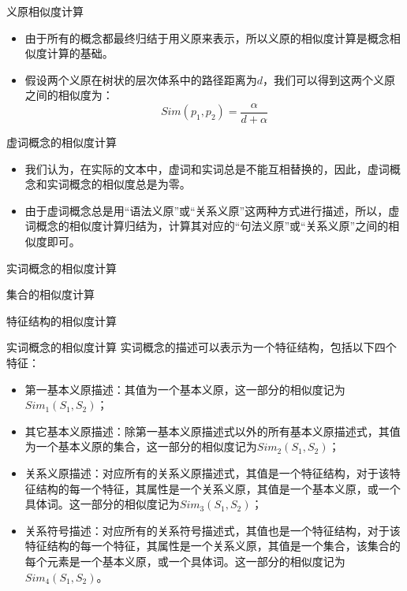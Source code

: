 \documentclass{beamer}
\begin{document}
    \begin{frame}{义原相似度计算}
      \begin{itemize}
        \item 由于所有的概念都最终归结于用义原来表示，所以义原的相似度计算是概念相似度计算的基础。
        \item 假设两个义原在树状的层次体系中的路径距离为$d$，我们可以得到这两个义原之间的相似度为：
        \begin{equation}
          Sim(p_1, p_2) = \frac{\alpha}{d + \alpha}
        \end{equation}
      \end{itemize}
    \end{frame}

    \begin{frame}{虚词概念的相似度计算}
      \begin{itemize}
        \item 我们认为，在实际的文本中，虚词和实词总是不能互相替换的，因此，虚词概念和实词概念的相似度总是为零。
        \item 由于虚词概念总是用“语法义原”或“关系义原”这两种方式进行描述，所以，虚词概念的相似度计算归结为，计算其对应的“句法义原”或“关系义原”之间的相似度即可。
      \end{itemize}
    \end{frame}

    \begin{frame}{实词概念的相似度计算}
      
    \end{frame}

    \begin{frame}{集合的相似度计算}
      
    \end{frame}

    \begin{frame}{特征结构的相似度计算}
      
    \end{frame}

    \begin{frame}{实词概念的相似度计算}
      实词概念的描述可以表示为一个特征结构，包括以下四个特征：
      \begin{itemize}
        \item 第一基本义原描述：其值为一个基本义原，这一部分的相似度记为$Sim_1(S_1,S_2)$；
        \item 其它基本义原描述：除第一基本义原描述式以外的所有基本义原描述式，其值为一个基本义原的集合，这一部分的相似度记为$Sim_2(S_1,S_2)$；
        \item 关系义原描述：对应所有的关系义原描述式，其值是一个特征结构，对于该特征结构的每一个特征，其属性是一个关系义原，其值是一个基本义原，或一个具体词。这一部分的相似度记为$Sim_3(S_1,S_2)$；
        \item 关系符号描述：对应所有的关系符号描述式，其值也是一个特征结构，对于该特征结构的每一个特征，其属性是一个关系义原，其值是一个集合，该集合的每个元素是一个基本义原，或一个具体词。这一部分的相似度记为$Sim_4(S_1,S_2)$。 
    \end{itemize}
    \end{frame}
\end{document}
